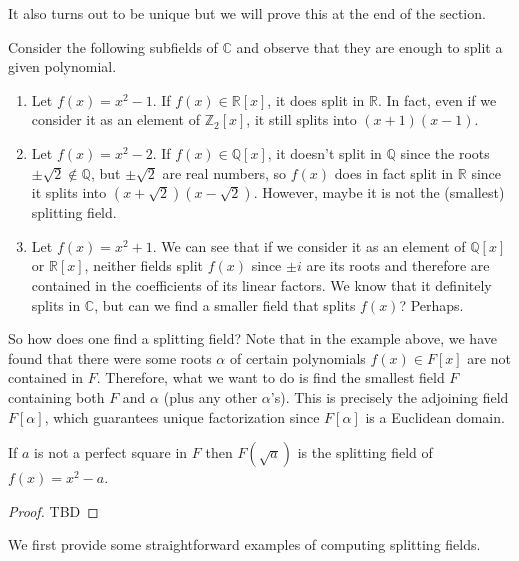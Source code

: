   It also turns out to be unique but we will prove this at the end of the section. 

  \begin{example}
    Consider the following subfields of $\mathbb{C}$ and observe that they are enough to split a given polynomial. 
    \begin{enumerate}
      \item Let $f(x) = x^2 - 1$. If $f(x) \in \mathbb{R}[x]$, it does split in $\mathbb{R}$. In fact, even if we consider it as an element of $\mathbb{Z}_2 [x]$, it still splits into $(x + 1)(x - 1)$. 
      \item Let $f(x) = x^2 - 2$. If $f(x) \in \mathbb{Q}[x]$, it doesn't split in $\mathbb{Q}$ since the roots $\pm \sqrt{2} \not\in \mathbb{Q}$, but $\pm \sqrt{2}$ are real numbers, so $f(x)$ does in fact split in $\mathbb{R}$ since it splits into $(x + \sqrt{2}) (x - \sqrt{2})$. However, maybe it is not the (smallest) splitting field. 
      \item Let $f(x) = x^2 + 1$. We can see that if we consider it as an element of $\mathbb{Q}[x]$ or $\mathbb{R}[x]$, neither fields split $f(x)$ since $\pm i$ are its roots and therefore are contained in the coefficients of its linear factors. We know that it definitely splits in $\mathbb{C}$, but can we find a smaller field that splits $f(x)$? Perhaps.  
    \end{enumerate}
  \end{example}

  So how does one find a splitting field? Note that in the example above, we have found that there were some roots $\alpha$ of certain polynomials $f(x) \in F[x]$ are not contained in $F$. Therefore, what we want to do is find the smallest field $F$ containing both $F$ and $\alpha$ (plus any other $\alpha$'s). This is precisely the adjoining field $F[\alpha]$, which guarantees unique factorization since $F[\alpha]$ is a Euclidean domain. 

  \begin{lemma}
    If $a$ is not a perfect square in $F$ then $F(\sqrt{a})$ is the splitting field of $f(x) = x^2 - a$. 
  \end{lemma}
  \begin{proof}
    TBD
  \end{proof}

  We first provide some straightforward examples of computing splitting fields. 

